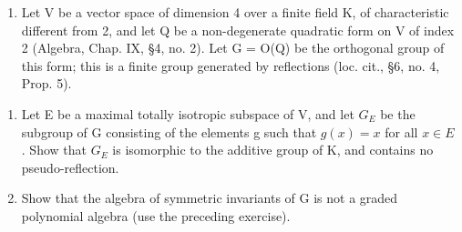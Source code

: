 \begin{enumerate}
\def\labelenumi{\arabic{enumi})}
\setcounter{enumi}{8}
\tightlist
\item
  Let V be a vector space of dimension 4 over a finite field K, of characteristic different from 2, and let Q be a non-degenerate quadratic form on V of index 2 (Algebra, Chap. IX, §4, no. 2). Let G = O(Q) be the orthogonal group of this form; this is a finite group generated by reflections (loc. cit., §6, no. 4, Prop. 5).
\end{enumerate}

\begin{enumerate}
\def\labelenumi{\alph{enumi})}
\item
  Let E be a maximal totally isotropic subspace of V, and let \(G_{E}\) be the subgroup of G consisting of the elements g such that \(g(x) = x\) for all \(x \in E\) . Show that \(G_{E}\) is isomorphic to the additive group of K, and contains no pseudo-reflection.
\item
  Show that the algebra of symmetric invariants of G is not a graded polynomial algebra (use the preceding exercise).
\end{enumerate}

